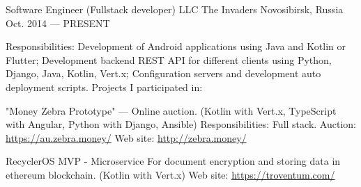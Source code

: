 


\begin{cventries}


\cventry
{Software Engineer (Fullstack developer)} %
{LLC The Invaders} %
{Novosibirsk, Russia} %
{Oct. 2014 --- PRESENT} %
{
Responsibilities: Development of Android applications using Java and Kotlin or Flutter; Development backend REST API for different clients using Python, Django, Java, Kotlin, Vert.x; Configuration servers and development auto deployment scripts.\linebreak
\linebreak
Projects I participated in:\linebreak
\linebreak
\begin{cvitems}
    \item {
        \begin{flushleft}
            "Money Zebra Prototype" --- Online auction. (Kotlin with Vert.x, TypeScript with Angular, Python with Django, Ansible)\linebreak
            Responsibilities: Full stack.\linebreak
            Auction: \url{https://au.zebra.money/}\linebreak
            Web site: \url{http://zebra.money/}\linebreak
        \end{flushleft}
    }
    \item {
        \begin{flushleft}
            RecyclerOS MVP - Microservice For document encryption and storing data in ethereum blockchain. (Kotlin with Vert.x)\linebreak
            Web site: \url{https://troventum.com/}\linebreak
        \end{flushleft}
    }
    \item {
}
\end{cvitems}}
\end{cventries}
